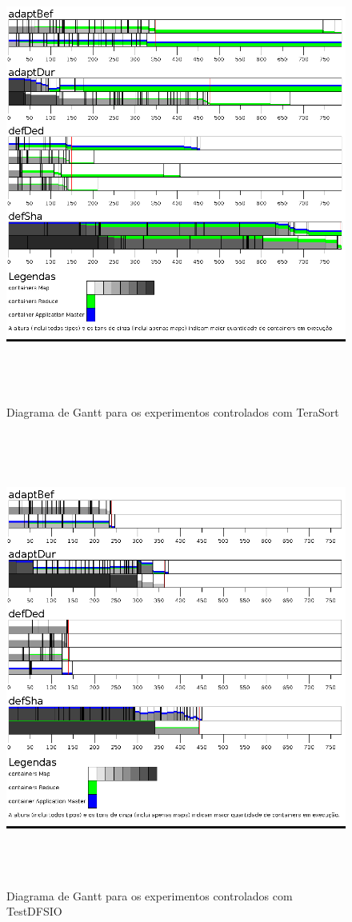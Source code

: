 \begin{figure}[!ht]
	\centering
	\includegraphics[height=15cm]{figuras/TS-simul.png}
	\caption{Diagrama de Gantt para os experimentos controlados com TeraSort}
	\label{fig:exp1TS}
\end{figure}

\begin{figure}[!ht]
	\centering
	\includegraphics[height=15cm]{figuras/DFS-simul.png} 
	\caption{Diagrama de Gantt para os experimentos controlados com TestDFSIO}
	\label{fig:exp1IO}
\end{figure}

